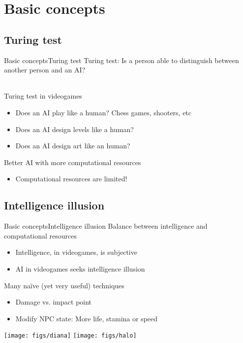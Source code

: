 \documentclass[10pt,compress]{beamer} %
\begin{document}
\section{Basic concepts}
\subsection{Turing test}
\begin{frame}{Basic concepts}{Turing test}
	   Turing test: Is a person able to distinguish between another person and an AI?\\
       \smallskip
		\\
       \smallskip
		\raggedright Turing test in videogames
 	 	\begin{itemize}
        \item Does an AI play like a human? Chess games, shooters, etc
        \item Does an AI design levels like a human?
        \item Does an AI design art like an human?
		\end{itemize}
		Better AI with more computational resources
 	 	\begin{itemize}
		\item Computational resources are limited!
		\end{itemize}
\end{frame}

\subsection{Intelligence illusion}
\begin{frame}{Basic concepts}{Intelligence illusion}
	Balance between intelligence and computational resources
  	\begin{itemize}
		\item Intelligence, in videogames, is subjective
		\item AI in videogames seeks \alert{intelligence illusion}
	\end{itemize}
	Many na\"ive (yet very useful) techniques
	\begin{itemize}
		\item Damage vs. impact point
		\item Modify NPC state: More life, stamina or speed
	\end{itemize}

    \bigskip

	\begin{center}
		\texttt{[image: figs/diana]}
		\vspace{2cm}
		\texttt{[image: figs/halo]}
	\end{center}
\end{frame}
\end{document}
